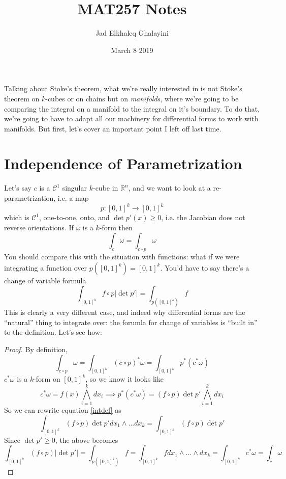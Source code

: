 \documentclass{article}
\title{MAT257 Notes}
\author{Jad Elkhaleq Ghalayini}
\date{March 8 2019}
\newcommand{\reals}[0]{\mathbb{R}}
\newcommand{\mc}[1]{\mathcal{#1}}
\begin{document}
\maketitle

Talking about Stoke's theorem, what we're really interested in is not Stoke's theorem on \(k\)-cubes or on chains but on \textit{manifolds}, where we're going to be comparing the integral on a manifold to the integral on it's boundary. To do that, we're going to have to adapt all our machinery for differential forms to work with manifolds. But first, let's cover an important point I left off last time.

\section{Independence of Parametrization}

Let's say \(c\) is a \(\mc{C}^1\) singular \(k\)-cube in \(\reals^n\), and we want to look at a re-parametrization, i.e. a map
\begin{equation}
  p : [0, 1]^k \to [0, 1]^k
\end{equation}
which is \(\mc{C}^1\), one-to-one, onto, and \(\det p'(x) \geq 0\), i.e. the Jacobian does not reverse orientations.
If \(\omega\) is a \(k\)-form then
\begin{equation}
  \int_c\omega = \int_{c \circ p}\omega
\end{equation}
You should compare this with the situation with functions: what if we were integrating a function over \(p([0, 1]^k) = [0, 1]^k\). You'd have to say there's a change of variable formula
\begin{equation}
  \int_{[0, 1]^k}f \circ p|\det p'| = \int_{p([0, 1]^k)}f
\end{equation}
This is clearly a very different case, and indeed why differential forms are the ``natural'' thing to integrate over: the forumla for change of variables is ``built in'' to the definition. Let's see how:
\begin{proof}
  By definition,
  \begin{equation}
    \int_{c \circ p}\omega = \int_{[0, 1]^k}(c \circ p)^*\omega = \int_{[0, 1]^k}p^*(c^*\omega)
    \label{intdef}
  \end{equation}
  \(c^*\omega\) is a \(k\)-form on \([0, 1]^k\), so we know it looks like
  \begin{equation}
    c^*\omega = f(x)\bigwedge_{i = 1}^kdx_i \implies p^*(c^*\omega) = (f \circ p)\det p' \bigwedge_{i = 1}^k dx_i
  \end{equation}
  So we can rewrite equation \ref{intdef} as
  \begin{equation}
    \int_{[0, 1]^k}(f \circ p)\det p'dx_1 \wedge ... dx_k = \int_{[0, 1]^k}(f \circ p)\det p'
  \end{equation}
  Since \(\det p' \geq 0\), the above becomes
  \begin{equation}
    \int_{[0, 1]^k}(f \circ p)|\det p'| = \int_{p([0, 1]^k)}f = \int_{[0, 1]^k}fdx_1 \wedge ... \wedge dx_k = \int_{[0, 1]^k}c^*\omega = \int_c\omega
  \end{equation}

\end{proof}
\end{document}
